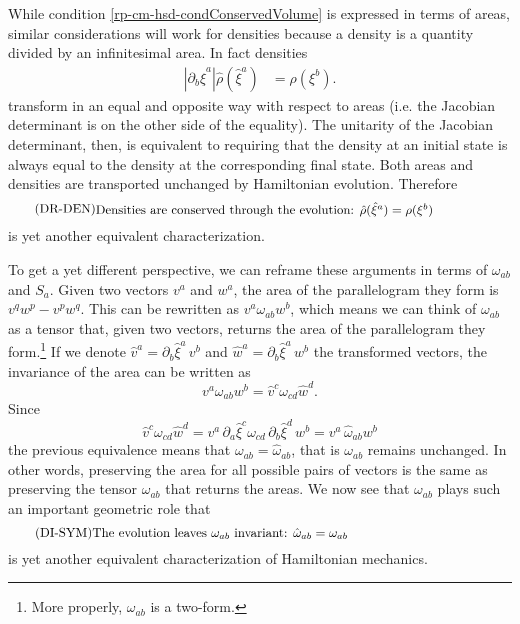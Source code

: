 While condition \ref{rp-cm-hsd-condConservedVolume} is expressed in terms of areas, similar considerations will work for densities because a density is a quantity divided by an infinitesimal area. In fact densities
\begin{equation}\label{rp-cm-densityTransformation1d}
	\begin{aligned}
		\left| \partial_b \hat{\xi}^a \right| \hat{\rho}(\hat{\xi}^a) &= \rho(\xi^b).
	\end{aligned}	
\end{equation}
transform in an equal and opposite way with respect to areas (i.e. the Jacobian determinant is on the other side of the equality). The unitarity of the Jacobian determinant, then, is equivalent to requiring that the density at an initial state is always equal to the density at the corresponding final state. Both areas and densities are transported unchanged by Hamiltonian evolution. Therefore
\begin{equation}\label{rp-cm-hsd-condConservedDensity}
	\tag{DR-DEN}
	\eqtext{Densities are conserved through the evolution: $\hat{\rho}(\hat{\xi}^a) = \rho(\xi^b)$ } 
\end{equation}
is yet another equivalent characterization.

To get a yet different perspective, we can reframe these arguments in terms of $\omega_{ab}$ and $S_a$. Given two vectors $v^a$ and $w^a$, the area of the parallelogram they form is $v^q w^p - v^p w^q$. This can be rewritten as $v^a \omega_{ab} w^b$, which means we can think of $\omega_{ab}$ as a tensor that, given two vectors, returns the area of the parallelogram they form.\footnote{More properly, $\omega_{ab}$ is a two-form.} If we denote $\hat{v}^a = \partial_b \hat{\xi}^a \, v^b$ and $\hat{w}^a = \partial_b \hat{\xi}^a \, w^b$ the transformed vectors, the invariance of the area can be written as
\begin{equation}
	v^a \omega_{ab} w^b = \hat{v}^c \omega_{cd} \hat{w}^d.
\end{equation}
Since
\begin{equation}
	\hat{v}^c \omega_{cd} \hat{w}^d = v^a \, \partial_a \hat{\xi}^c \omega_{cd} \, \partial_b \hat{\xi}^d \, w^b = v^a \, \hat{\omega}_{ab} w^b
\end{equation}
the previous equivalence means that $\omega_{ab} = \hat{\omega}_{ab}$, that is $\omega_{ab}$ remains unchanged. In other words, preserving the area for all possible pairs of vectors is the same as preserving the tensor $\omega_{ab}$ that returns the areas. We now see that $\omega_{ab}$ plays such an important geometric role that
\begin{equation}\label{rp-cm-hsd-condConservedSymplectic}
	\tag{DI-SYM}
	\eqtext{The evolution leaves $\omega_{ab}$ invariant: $\hat{\omega}_{ab} = \omega_{ab}$} 
\end{equation}
is yet another equivalent characterization of Hamiltonian mechanics.


